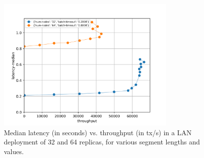 \documentclass{article}
\begin{document}
\begin{figure}
    \centering
    \includegraphics[width=0.79\textwidth]{figures/results-lan-final.png}
    \caption{\centering Median latency (in seconds) vs. throughput (in tx/s)
    in a LAN deployment of 32 and 64 replicas,
    for various segment lengths and  values.}
    \label{fig:eval-lan}
\end{figure}


\end{document}
